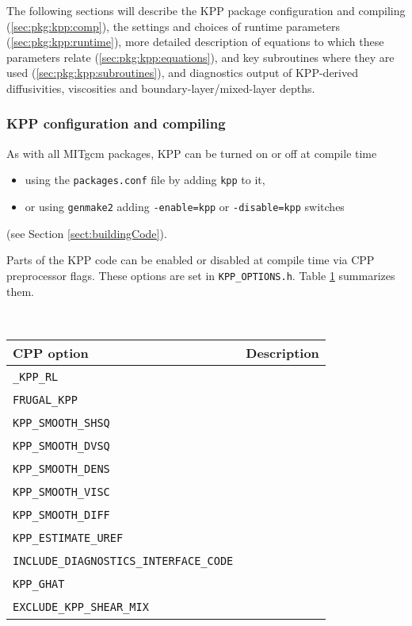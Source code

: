 The following sections will describe the KPP package
configuration and compiling (\ref{sec:pkg:kpp:comp}),
the settings and choices of runtime parameters
(\ref{sec:pkg:kpp:runtime}),
more detailed description of equations to which these
parameters relate (\ref{sec:pkg:kpp:equations}),
and key subroutines where they are used (\ref{sec:pkg:kpp:subroutines}),
and diagnostics output of KPP-derived diffusivities, viscosities
and boundary-layer/mixed-layer depths.


\subsubsection{KPP configuration and compiling
\label{sec:pkg:kpp:comp}}

As with all MITgcm packages, KPP can be turned on or off at compile time
%
\begin{itemize}
%
\item
using the \texttt{packages.conf} file by adding \texttt{kpp} to it,
%
\item
or using \texttt{genmake2} adding
\texttt{-enable=kpp} or \texttt{-disable=kpp} switches
%
\end{itemize}
(see Section \ref{sect:buildingCode}).

Parts of the KPP code can be enabled or disabled at compile time
via CPP preprocessor flags. These options are set in
\texttt{KPP\_OPTIONS.h}. Table \ref{tab:pkg:kpp:cpp} summarizes them.

\begin{table}[h!]
\centering
  \label{tab:pkg:kpp:cpp}
  {\footnotesize
    \begin{tabular}{|l|l|}
      \hline 
      \textbf{CPP option}  &  \textbf{Description}  \\
      \hline \hline
        \texttt{\_KPP\_RL} & 
          ~ \\
        \texttt{FRUGAL\_KPP} & 
          ~ \\
        \texttt{KPP\_SMOOTH\_SHSQ} & 
          ~ \\
        \texttt{KPP\_SMOOTH\_DVSQ} & 
          ~ \\
        \texttt{KPP\_SMOOTH\_DENS} & 
          ~ \\
        \texttt{KPP\_SMOOTH\_VISC} & 
          ~ \\
        \texttt{KPP\_SMOOTH\_DIFF} & 
          ~ \\
        \texttt{KPP\_ESTIMATE\_UREF} & 
          ~ \\
        \texttt{INCLUDE\_DIAGNOSTICS\_INTERFACE\_CODE} & 
          ~ \\
        \texttt{KPP\_GHAT} & 
          ~ \\
        \texttt{EXCLUDE\_KPP\_SHEAR\_MIX} & 
          ~ \\
      \hline
    \end{tabular}
  }
  \caption{~}
\end{table}


